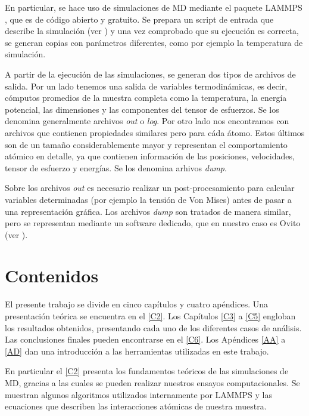 En particular, se hace uso de simulaciones de MD mediante el paquete LAMMPS \citep{plimpton95}, que es de código abierto y gratuito. Se prepara un script de entrada que describe la simulación (ver ) y una vez comprobado que su ejecución es correcta, se generan copias con parámetros diferentes, como por ejemplo la temperatura de simulación.

A partir de la ejecución de las simulaciones, se generan dos tipos de archivos de salida. Por un lado tenemos una salida de variables termodinámicas, es decir, cómputos promedios de la muestra completa como la temperatura, la energía potencial, las dimensiones y las componentes del tensor de esfuerzos. Se los denomina generalmente archivos \textit{out} o \textit{log}. Por otro lado nos encontramos con archivos que contienen propiedades similares pero para cáda átomo. Estos últimos son de un tamaño considerablemente mayor y representan el comportamiento atómico en detalle, ya que contienen información de las posiciones, velocidades, tensor de esfuerzo y energías. Se los denomina arhivos \textit{dump}.

Sobre los archivos \textit{out} es necesario realizar un post-procesamiento para calcular variables determinadas (por ejemplo la tensión de Von Mises) antes de pasar a una representación gráfica. Los archivos \textit{dump} son tratados de manera similar, pero se representan mediante un  software dedicado, que en nuestro caso es Ovito \citep{stukowski10} (ver ).


\section{Contenidos}
\label{S1_6}

El presente trabajo se divide en cinco capítulos y cuatro apéndices. Una presentación teórica se encuentra en el \cref{C2}. Los Capítulos \ref{C3} a \ref{C5} engloban los resultados obtenidos, presentando cada uno de los diferentes casos de análisis. Las conclusiones finales pueden encontrarse en el \cref{C6}. Los Apéndices \ref{AA} a \ref{AD} dan una introducción a las herramientas utilizadas en este trabajo.

En particular el \cref{C2} presenta los fundamentos teóricos de las simulaciones de MD, gracias a las cuales se pueden realizar nuestros ensayos computacionales. Se muestran algunos algoritmos utilizados internamente por LAMMPS y las ecuaciones que describen las interacciones atómicas de nuestra muestra.

